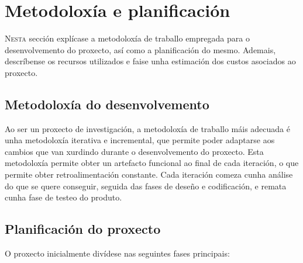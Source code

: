 \chapter{Metodoloxía e planificación}
\label{chap:Metodoloxía e planificación}
\lettrine{N}{esta} sección explícase a metodoloxía de traballo empregada para o desenvolvemento do proxecto, así como a planificación do mesmo.
 Ademais, descríbense os recursos utilizados e faise unha estimación dos custos asociados ao proxecto.

\section{Metodoloxía do desenvolvemento}
\label{sec:Metodoloxía do desenvolvemento}

Ao ser un proxecto de investigación, a metodoloxía de traballo máis adecuada é unha metodoloxía iterativa e incremental, que permite poder adaptarse aos cambios que van xurdindo durante o desenvolvemento do proxecto.
Esta metodoloxía permite obter un artefacto funcional ao final de cada iteración, o que permite obter retroalimentación constante.
Cada iteración comeza cunha análise do que se quere conseguir, seguida das fases de deseño e codificación, e remata cunha fase de testeo do produto.

\section{Planificación do proxecto}
\label{sec:Planificación do proxecto}
O proxecto inicialmente divídese nas seguintes fases principais:

